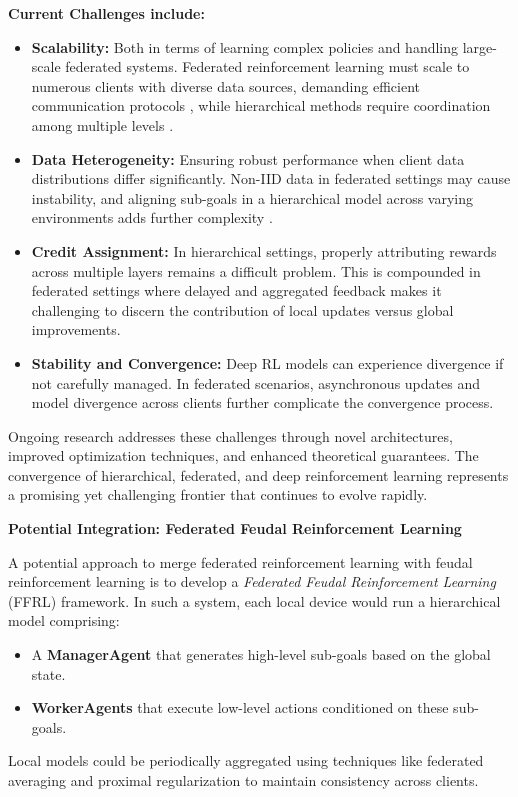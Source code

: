 \documentclass[12pt,a4paper,twoside,openany]{book}
\begin{document}
\textbf{Current Challenges include:}
\begin{itemize}
    \item \textbf{Scalability:} Both in terms of learning complex policies and handling large-scale federated systems. Federated reinforcement learning must scale to numerous clients with diverse data sources, demanding efficient communication protocols \cite{McMahan2016}, while hierarchical methods require coordination among multiple levels \cite{Vezhnevets2017}.
    \item \textbf{Data Heterogeneity:} Ensuring robust performance when client data distributions differ significantly. Non-IID data in federated settings may cause instability, and aligning sub-goals in a hierarchical model across varying environments adds further complexity \cite{Li2020}.
    \item \textbf{Credit Assignment:} In hierarchical settings, properly attributing rewards across multiple layers remains a difficult problem. This is compounded in federated settings where delayed and aggregated feedback makes it challenging to discern the contribution of local updates versus global improvements.
    \item \textbf{Stability and Convergence:} Deep RL models can experience divergence if not carefully managed. In federated scenarios, asynchronous updates and model divergence across clients further complicate the convergence process.
\end{itemize}

Ongoing research addresses these challenges through novel architectures, improved optimization techniques, and enhanced theoretical guarantees. The convergence of hierarchical, federated, and deep reinforcement learning represents a promising yet challenging frontier that continues to evolve rapidly.

\textbf{Potential Integration: Federated Feudal Reinforcement Learning}

A potential approach to merge federated reinforcement learning with feudal reinforcement learning is to develop a \emph{Federated Feudal Reinforcement Learning} (FFRL) framework. In such a system, each local device would run a hierarchical model comprising:
\begin{itemize}
    \item A \textbf{ManagerAgent} that generates high-level sub-goals based on the global state.
    \item \textbf{WorkerAgents} that execute low-level actions conditioned on these sub-goals.
\end{itemize}
Local models could be periodically aggregated using techniques like federated averaging \cite{McMahan2016} and proximal regularization \cite{Li2020} to maintain consistency across clients.
\end{document}
